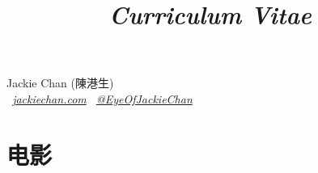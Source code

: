 \documentclass[11pt,a4paper]{moderncv}
\title{\emph{Curriculum Vitae}}
\begin{document}
\begin{center}
\Huge{Jackie Chan (陳港生)}\\ \normalsize
\vspace{3mm}
\emph{
\faGlobe\ \emph{\href{http://www.jackiechan.com/}{jackiechan.com}}
\hspace{3mm} 
\faTwitter\  \emph{\href{http://twitter.com/EyeOfJackieChan}{@EyeOfJackieChan}}}
\vspace{3mm}
\end{center}

\section{电影}
\end{document}
